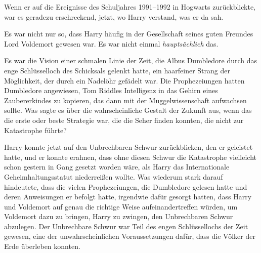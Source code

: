 Wenn er auf die Ereignisse des Schuljahres 1991–1992 in Hogwarts zurückblickte, war es geradezu erschreckend, jetzt, wo Harry verstand, was er da sah.

Es war nicht nur so, dass Harry häufig in der Gesellschaft seines guten Freundes Lord Voldemort gewesen war. Es war nicht einmal \emph{hauptsächlich} das.

Es war die Vision einer schmalen Linie der Zeit, die Albus Dumbledore durch das enge Schlüsselloch des Schicksals gelenkt hatte, ein haarfeiner Strang der Möglichkeit, der durch ein Nadelöhr gefädelt war.
Die Prophezeiungen hatten Dumbledore angewiesen, Tom Riddles Intelligenz in das Gehirn eines Zaubererkindes zu kopieren, das dann mit der Muggelwissenschaft aufwachsen sollte. Was sagte es über die wahrscheinliche Gestalt der Zukunft aus, wenn das die erste oder beste Strategie war, die die Seher finden konnten, die nicht zur Katastrophe führte?

Harry konnte jetzt auf den Unbrechbaren Schwur zurückblicken, den er geleistet hatte, und er konnte erahnen, dass ohne diesen Schwur die Katastrophe vielleicht schon gestern in Gang gesetzt worden wäre, als Harry das Internationale Geheimhaltungsstatut niederreißen wollte.
Was wiederum stark darauf hindeutete, dass die vielen Prophezeiungen, die Dumbledore gelesen hatte und deren Anweisungen er befolgt hatte, irgendwie dafür gesorgt hatten, dass Harry und Voldemort auf genau die richtige Weise aufeinandertreffen würden, um Voldemort dazu zu bringen, Harry zu zwingen, den Unbrechbaren Schwur abzulegen. Der Unbrechbare Schwur war Teil des engen Schlüssellochs der Zeit gewesen, eine der unwahrscheinlichen Voraussetzungen dafür, dass die Völker der Erde überleben konnten.

